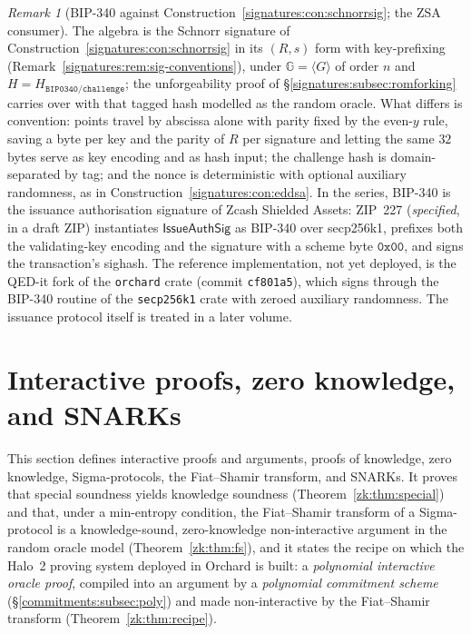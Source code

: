 \documentclass[11pt,a4paper]{article}
\theoremstyle{definition}
\theoremstyle{remark}
\newtheorem{remark}[theorem]{Remark}
\newcommand{\G}{\ensuremath{\mathbb{G}}}
\begin{document}
\begin{remark}[BIP-340 against
Construction~\ref{signatures:con:schnorrsig}; the ZSA consumer]
\label{signatures:rem:bip340}
The algebra is the Schnorr signature of
Construction~\ref{signatures:con:schnorrsig} in its \((R, s)\) form
with key-prefixing (Remark~\ref{signatures:rem:sig-conventions}),
under \(\G = \langle G \rangle\) of order \(n\) and
\(H = H_{\mathtt{BIP0340/challenge}}\); the unforgeability proof of
\S\ref{signatures:subsec:romforking} carries over with that tagged
hash modelled as the random oracle. What differs is convention:
points travel by abscissa alone with parity fixed by the even-\(y\)
rule, saving a byte per key and the parity of \(R\) per signature
and letting the same \(32\) bytes serve as key encoding and as hash
input; the challenge hash is domain-separated by tag; and the nonce
is deterministic with optional auxiliary randomness, as in
Construction~\ref{signatures:con:eddsa}. In the series, BIP-340 is
the issuance authorisation signature of Zcash Shielded Assets:
ZIP~227 (\emph{specified}, in a draft ZIP) instantiates
\(\mathsf{IssueAuthSig}\) as BIP-340 over secp256k1, prefixes both
the validating-key encoding and the signature with a scheme byte
\(\mathtt{0x00}\), and signs the transaction's sighash. The
reference implementation, not yet deployed, is the QED-it fork of
the \texttt{orchard} crate (commit \texttt{cf801a5}), which signs
through the BIP-340 routine of the \texttt{secp256k1} crate with zeroed
auxiliary randomness. The issuance
protocol itself is treated in a later volume.
\end{remark}

\section{Interactive proofs, zero knowledge, and SNARKs}\label{sec:zk}

This section defines interactive proofs and arguments, proofs of
knowledge, zero knowledge, Sigma-protocols, the Fiat--Shamir transform,
and SNARKs. It proves that special soundness yields knowledge soundness
(Theorem~\ref{zk:thm:special}) and that, under a min-entropy condition,
the Fiat--Shamir transform of a Sigma-protocol is a knowledge-sound,
zero-knowledge non-interactive argument in the random oracle model
(Theorem~\ref{zk:thm:fs}), and it states the recipe on which the Halo~2
proving system deployed in Orchard is built: a \emph{polynomial
interactive oracle proof}, compiled into an argument by a
\emph{polynomial commitment scheme} (\S\ref{commitments:subsec:poly})
and made non-interactive by the Fiat--Shamir transform
(Theorem~\ref{zk:thm:recipe}).
\end{document}
